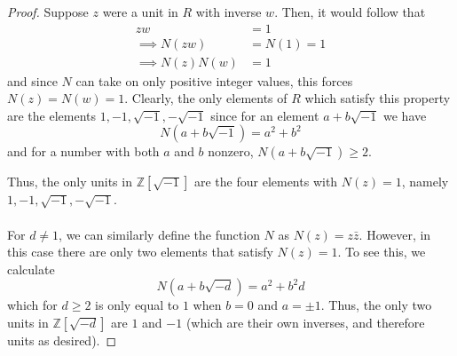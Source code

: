 \documentclass[12pt,reqno]{amsart}
\newcommand{\Z}{\mathbb{Z}}
\begin{document}
\begin{proof}
    Suppose $z$ were a unit in $R$ with inverse $w$. Then, it would follow that
    \[
\begin{aligned}
    zw &= 1\\
    \implies N(zw) &= N(1) = 1\\
    \implies N(z)N(w) &= 1
\end{aligned}
    \]
    and since $N$ can take on only positive integer values, this forces $N(z) =
    N(w) = 1$. Clearly, the only elements of $R$ which satisfy this property are
    the elements $1,-1,\sqrt{-1},-\sqrt{-1}$ since for an element $a+b\sqrt{-1}$
    we have
    \[
        N(a+b\sqrt{-1}) = a^2+b^2
    \]
    and for a number with both $a$ and $b$ nonzero, $N(a+b\sqrt{-1})\geq 2$.

    Thus, the only units in $\Z[\sqrt{-1}]$ are the four elements with $N(z) =
    1$, namely $1,-1,\sqrt{-1},-\sqrt{-1}$.
    \\
    \\
    For $d\neq 1$, we can similarly define the function $N$ as $N(z) =
    z\bar{z}$. However, in this case there are only two elements that satisfy
    $N(z) = 1$. To see this, we calculate
    \[
        N(a+b\sqrt{-d}) = a^2 + b^2d
    \]
    which for $d\geq 2$ is only equal to $1$ when $b=0$ and $a=\pm 1$. Thus, the
    only two units in $\Z[\sqrt{-d}]$ are $1$ and $-1$ (which are their own
    inverses, and therefore units as desired).
\end{proof}

\newpage
\end{document}
